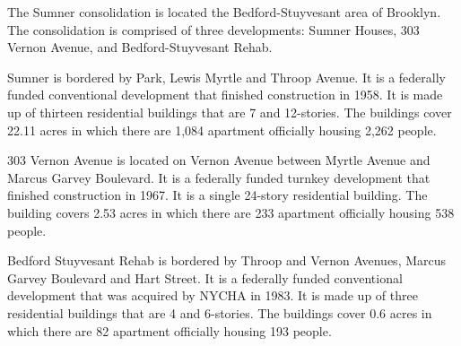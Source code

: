The Sumner consolidation is located the Bedford-Stuyvesant area of Brooklyn. The consolidation is comprised of three developments: Sumner Houses, 303 Vernon Avenue, and Bedford-Stuyvesant Rehab. 

Sumner is bordered by Park, Lewis Myrtle and Throop Avenue. It is a federally funded conventional development that finished construction in 1958. It is made up of thirteen residential buildings that are 7 and 12-stories. The buildings cover 22.11 acres in which there are 1,084 apartment officially housing 2,262 people. 

303 Vernon Avenue is located on Vernon Avenue between Myrtle Avenue and Marcus Garvey Boulevard. It is a federally funded turnkey development that finished construction in 1967. It is a single 24-story residential building. The building covers 2.53 acres in which there are 233 apartment officially housing 538 people. 

Bedford Stuyvesant Rehab is bordered by Throop and Vernon Avenues, Marcus Garvey Boulevard and Hart Street. It is a federally funded conventional development that was acquired by NYCHA in 1983. It is made up of three residential buildings that are 4 and 6-stories. The buildings cover 0.6 acres in which there are 82 apartment officially housing 193 people. 